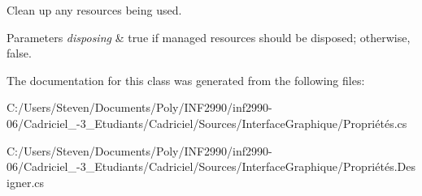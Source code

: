 Clean up any resources being used. 


\begin{DoxyParams}{Parameters}
{\em disposing} & true if managed resources should be disposed; otherwise, false.\\
\hline
\end{DoxyParams}


The documentation for this class was generated from the following files\+:\begin{DoxyCompactItemize}
\item 
C\+:/\+Users/\+Steven/\+Documents/\+Poly/\+I\+N\+F2990/inf2990-\/06/\+Cadriciel\+\_-\/3\+\_\+\+Etudiants/\+Cadriciel/\+Sources/\+Interface\+Graphique/Propriétés.\+cs\item 
C\+:/\+Users/\+Steven/\+Documents/\+Poly/\+I\+N\+F2990/inf2990-\/06/\+Cadriciel\+\_-\/3\+\_\+\+Etudiants/\+Cadriciel/\+Sources/\+Interface\+Graphique/Propriétés.\+Designer.\+cs\end{DoxyCompactItemize}
